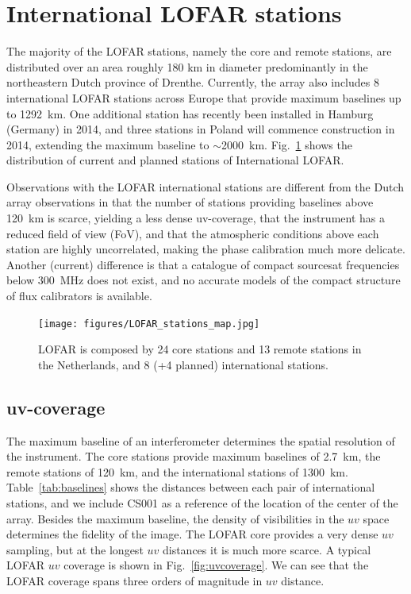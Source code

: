 \documentclass[graybox]{svmult}
\begin{document}
\section{International LOFAR stations}
The majority of the LOFAR stations, namely the core and remote stations, are
distributed over an area roughly 180 km in diameter predominantly in the
northeastern Dutch province of Drenthe. Currently, the array also includes 8
international LOFAR stations across Europe that provide maximum baselines up to
1292~km. One additional station has recently been installed in Hamburg (Germany)
in 2014, and three stations in Poland will commence construction in 2014,
extending the maximum baseline to $\sim$2000~km. Fig.~\ref{fig:stations} shows
the distribution of current and planned stations of International LOFAR.

Observations with the LOFAR international stations are different from the Dutch
array observations in that the number of stations providing baselines above
120~km is scarce, yielding a less dense uv-coverage, that the instrument has a
reduced field of view (FoV), and that the atmospheric conditions above each
station are highly uncorrelated, making the phase calibration much more
delicate. Another (current) difference is that a catalogue of compact sourcesat
frequencies below 300~MHz does not exist, and no accurate models of the compact
structure of flux calibrators is available.

\begin{figure}[t]
\begin{center}
\texttt{[image: figures/LOFAR\_stations\_map.jpg]}
\caption{LOFAR is composed by 24 core stations and 13 remote stations in the
Netherlands, and 8 (+4 planned) international stations.}
\label{fig:stations}
\end{center}
\end{figure}

\subsection{uv-coverage}\label{sec:uvcoverage}

The maximum baseline of an interferometer determines the spatial resolution of
the instrument. The core stations provide maximum baselines of 2.7~km, the
remote stations of 120~km, and the international stations of 1300~km.
Table~\ref{tab:baselines} shows the distances between each pair of
international stations, and we include CS001 as a reference of the location of
the center of the array.  Besides the maximum baseline, the density of
visibilities in the $uv$ space determines the fidelity of the image. The LOFAR
core provides a very dense $uv$ sampling, but at the longest $uv$ distances it
is much more scarce.  A typical LOFAR $uv$ coverage is shown in
Fig.~\ref{fig:uvcoverage}. We can see that the LOFAR coverage spans three
orders of magnitude in $uv$ distance.
\end{document}
